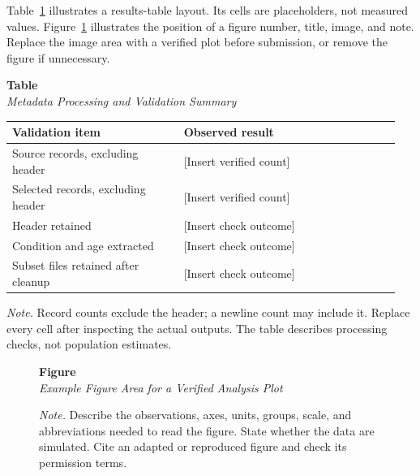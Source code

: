\documentclass[12pt,letterpaper]{article}
\begin{document}
Table~\ref{tab:validation} illustrates a results-table layout. Its cells are
placeholders, not measured values. Figure~\ref{fig:example} illustrates the
position of a figure number, title, image, and note. Replace the image area
with a verified plot before submission, or remove the figure if unnecessary.

\begin{table}[H]
\label{tab:validation}
\noindent\textbf{Table \thetable}\\
\noindent\textit{Metadata Processing and Validation Summary}\par
\begin{singlespace}
\smallskip
\begin{tabular}{@{}p{0.42\linewidth}p{0.53\linewidth}@{}}
\toprule
Validation item & Observed result \\
\midrule
Source records, excluding header & [Insert verified count] \\
Selected records, excluding header & [Insert verified count] \\
Header retained & [Insert check outcome] \\
Condition and age extracted & [Insert check outcome] \\
Subset files retained after cleanup & [Insert check outcome] \\
\bottomrule
\end{tabular}
\smallskip
\end{singlespace}
\noindent\textit{Note.} Record counts exclude the header; a newline count may
include it. Replace every cell after inspecting the actual outputs. The table
describes processing checks, not population estimates.
\end{table}

\begin{figure}[H]
\label{fig:example}
\noindent\textbf{Figure \thefigure}\\
\noindent\textit{Example Figure Area for a Verified Analysis Plot}\par
\begin{singlespace}
\smallskip
\noindent{}
\smallskip
\end{singlespace}
\noindent\textit{Note.} Describe the observations, axes, units, groups, scale,
and abbreviations needed to read the figure. State whether the data are
simulated. Cite an adapted or reproduced figure and check its permission terms.
\end{figure}
\end{document}
